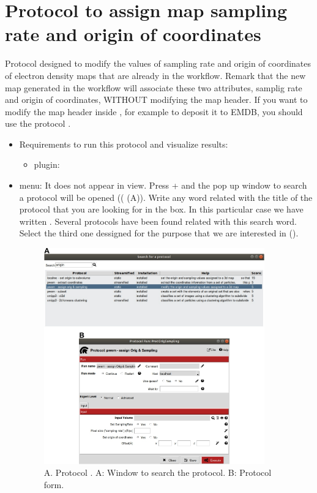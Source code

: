 \section{Protocol to assign map sampling rate and origin of coordinates}
\label{app:asignOrigAndSampling}%

Protocol designed to modify the values of sampling rate and origin of coordinates of electron density maps that are already in the \scipion workflow. Remark that the new map generated in the \scipion workflow will associate these two attributes, samplig rate and origin of coordinates, WITHOUT modifying the map header. If you want to modify the map header inside \scipion, for example to deposit it to EMDB, you should use the protocol .
   
 \begin{itemize}
  \item Requirements to run this protocol and visualize results:
    \begin{itemize}
        \item \scipion plugin: 
    \end{itemize}
  \item \scipion menu:
  It does not appear in  view.
  Press  +  and the pop up window to search a protocol will be opened (( (A)). Write any word related with the title of the protocol that you are looking for in the  box. In this particular case we have written . Several protocols have been found related with this search word. Select the third one dessigned for the purpose that we are interested in ().
  
    \begin{figure}[H]
    \centering 
    \captionsetup{width=.7\linewidth} 
    \includegraphics[width=0.90\textwidth]{Images_appendix/Fig301.pdf}
    \caption{A. Protocol . A: Window to search the protocol. B: Protocol form.}
    \label{fig:app_protocol_assign_orig_and_sampling}
   \end{figure}
  

\end{itemize}
